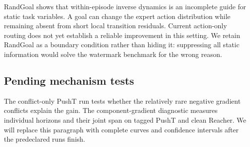 RandGoal shows that within-episode inverse dynamics is an incomplete guide for
static task variables.  A goal can change the expert action distribution while
remaining absent from short local transition residuals.  Current action-only
routing does not yet establish a reliable improvement in this setting.  We
retain RandGoal as a boundary condition rather than hiding it: suppressing all
static information would solve the watermark benchmark for the wrong reason.

\subsection{Pending mechanism tests}

The conflict-only PushT run tests whether the relatively rare negative
gradient conflicts explain the gain.  The component-gradient diagnostic
measures individual horizons and their joint span on tagged PushT and clean
Reacher.  We will replace this paragraph with complete curves and confidence
intervals after the predeclared runs finish.  
